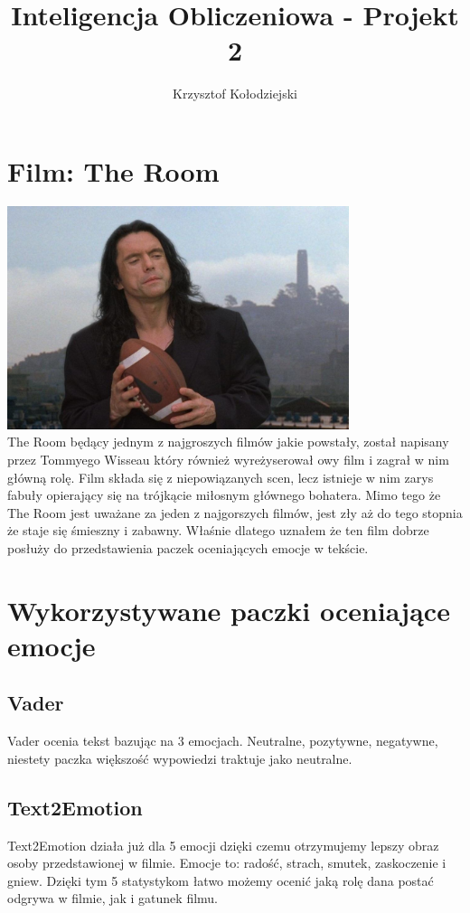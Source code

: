 \documentclass[a4paper,12pt]{article}
\title{Inteligencja Obliczeniowa - Projekt 2}
\author{Krzysztof Kołodziejski}
\begin{document}
	\maketitle
	\section {Film: The Room}
	{\includegraphics[width=10cm]{johnny.jpg}}\\
	The Room będący jednym z najgroszych filmów jakie powstały, został napisany przez Tommyego Wisseau który również wyreżyserował owy film i zagrał w nim główną rolę.
	Film składa się z niepowiązanych scen, lecz istnieje w nim zarys fabuły opierający się na trójkącie miłosnym głównego bohatera.
	Mimo tego że The Room jest uważane za jeden z najgorszych filmów, jest zły aż do tego stopnia że staje się śmieszny i zabawny. Właśnie dlatego uznałem że ten film dobrze posłuży do przedstawienia paczek oceniających emocje w tekście.
	\clearpage
	\section {Wykorzystywane paczki oceniające emocje}
	\subsection{Vader}
	Vader ocenia tekst bazując na 3 emocjach. Neutralne, pozytywne, negatywne, niestety paczka większość wypowiedzi traktuje jako neutralne.
	\subsection{Text2Emotion}
	Text2Emotion działa już dla 5 emocji dzięki czemu otrzymujemy lepszy obraz osoby przedstawionej w filmie.
	Emocje to: radość, strach, smutek, zaskoczenie i gniew.
	Dzięki tym 5 statystykom łatwo możemy ocenić jaką rolę dana postać odgrywa w filmie, jak i gatunek filmu.
\end{document}
